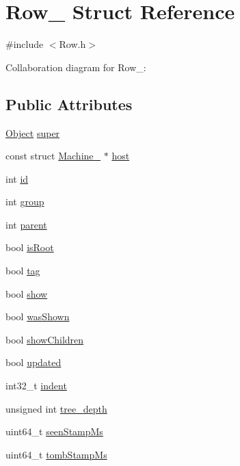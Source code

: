 \hypertarget{structRow__}{}\section{Row\+\_\+ Struct Reference}
\label{structRow__}


{\ttfamily \#include $<$Row.\+h$>$}



Collaboration diagram for Row\+\_\+\+:
\subsection*{Public Attributes}
\begin{DoxyCompactItemize}
\item 
\hyperlink{Object_8h_a32b67ad7134cd31b5ec5ed9c6a2d3978}{Object} \hyperlink{structRow___af33f11b963b05d6abbc2d3b1e4c01677}{super}
\item 
const struct \hyperlink{structMachine__}{Machine\+\_\+} $\ast$ \hyperlink{structRow___a5cb29ad56d945d612993e00acd263278}{host}
\item 
int \hyperlink{structRow___a10d687778253cc6fd6ce9bc88af73c8c}{id}
\item 
int \hyperlink{structRow___a895726a3a1d0aef319bc7a9b10389c50}{group}
\item 
int \hyperlink{structRow___aa5aaf7d8e0813e635e985813f60e6859}{parent}
\item 
bool \hyperlink{structRow___a80a57b392ea551b5936161341d0eb6e9}{is\+Root}
\item 
bool \hyperlink{structRow___a2b0ab53782aa678a48fb65b4a838a117}{tag}
\item 
bool \hyperlink{structRow___a550dd4ee8911897738f0ba992c008d43}{show}
\item 
bool \hyperlink{structRow___a56c89fbb1b1a4843cbeb50d86a238d0c}{was\+Shown}
\item 
bool \hyperlink{structRow___a5214e80792ca6ce8fef09afe4860efa9}{show\+Children}
\item 
bool \hyperlink{structRow___a06fda62c475be6b301f2e3fc53aaa864}{updated}
\item 
int32\+\_\+t \hyperlink{structRow___a0c4ebf924a12ff72b692989cb6c775d8}{indent}
\item 
unsigned int \hyperlink{structRow___a826b4abdace776629e258bca0a8e4f59}{tree\+\_\+depth}
\item 
uint64\+\_\+t \hyperlink{structRow___a0b594c88f057c8e98b2d3d993f1913d4}{seen\+Stamp\+Ms}
\item 
uint64\+\_\+t \hyperlink{structRow___ac9eaf58061d7d8baa39c3425e09e8ea8}{tomb\+Stamp\+Ms}
\end{DoxyCompactItemize}


